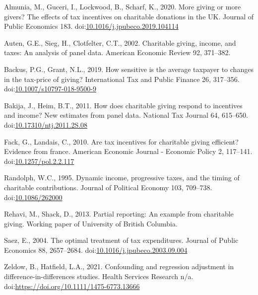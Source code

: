 \documentclass[
  11pt,
  a4paper,
]{article}
\newlength{\cslhangindent}
\newlength{\cslentryspacingunit} %
\newenvironment{CSLReferences}[2] %
 {%
  \setlength{\parindent}{0pt}
  \ifodd #1
  \let\oldpar\par
  \def\par{\hangindent=\cslhangindent\oldpar}
  \fi
  \setlength{\parskip}{#2\cslentryspacingunit}
 }%
 {}
\begin{document}
\hypertarget{refs}{}
\begin{CSLReferences}{1}{0}
\leavevmode{}%
Almunia, M., Guceri, I., Lockwood, B., Scharf, K., 2020. More giving or more givers? The effects of tax incentives on charitable donations in the UK. Journal of Public Economics 183. doi:\href{https://doi.org/10.1016/j.jpubeco.2019.104114}{10.1016/j.jpubeco.2019.104114}

\leavevmode{}%
Auten, G.E., Sieg, H., Clotfelter, C.T., 2002. Charitable giving, income, and taxes: An analysis of panel data. American Economic Review 92, 371--382.

\leavevmode{}%
Backus, P.G., Grant, N.L., 2019. How sensitive is the average taxpayer to changes in the tax-price of giving? International Tax and Public Finance 26, 317--356. doi:\href{https://doi.org/10.1007/s10797-018-9500-9}{10.1007/s10797-018-9500-9}

\leavevmode{}%
Bakija, J., Heim, B.T., 2011. How does charitable giving respond to incentives and income? New estimates from panel data. National Tax Journal 64, 615--650. doi:\href{https://doi.org/10.17310/ntj.2011.2S.08}{10.17310/ntj.2011.2S.08}

\leavevmode{}%
Fack, G., Landais, C., 2010. Are tax incentives for charitable giving efficient? Evidence from france. American Economic Journal - Economic Policy 2, 117--141. doi:\href{https://doi.org/10.1257/pol.2.2.117}{10.1257/pol.2.2.117}

\leavevmode{}%
Randolph, W.C., 1995. Dynamic income, progressive taxes, and the timing of charitable contributions. Journal of Political Economy 103, 709--738. doi:\href{https://doi.org/10.1086/262000}{10.1086/262000}

\leavevmode{}%
Rehavi, M., Shack, D., 2013. Partial reporting: An example from charitable giving. Working paper of University of British Columbia.

\leavevmode{}%
Saez, E., 2004. The optimal treatment of tax expenditures. Journal of Public Economics 88, 2657--2684. doi:\href{https://doi.org/10.1016/j.jpubeco.2003.09.004}{10.1016/j.jpubeco.2003.09.004}

\leavevmode{}%
Zeldow, B., Hatfield, L.A., 2021. Confounding and regression adjustment in difference-in-differences studies. Health Services Research n/a. doi:\url{https://doi.org/10.1111/1475-6773.13666}

\end{CSLReferences}
\end{document}
